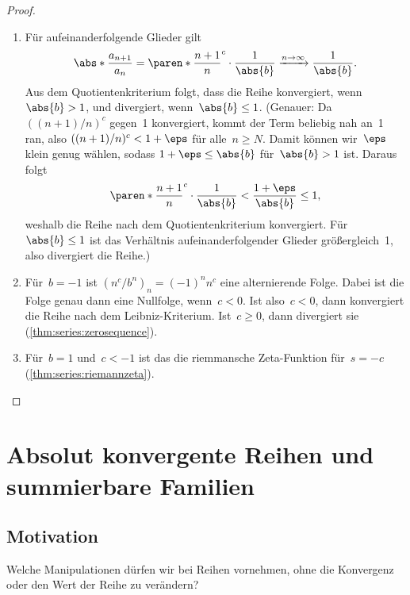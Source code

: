 \documentclass[a4paper]{article}
\begin{document}
\begin{proof}\leavevmode
    \begin{enumerate}
        \item Für aufeinanderfolgende Glieder gilt
              \begin{equation*}
                  \abs*{\frac{a_{n+1}}{a_n}} = \paren*{\frac{n+1}{n}}^c \cdot \frac{1}{\abs{b}} \xrightarrow{n\to\infty} \frac{1}{\abs{b}}.
              \end{equation*}
              Aus dem Quotientenkriterium folgt, dass die Reihe konvergiert, wenn~$\abs{b} > 1$, und divergiert, wenn~$\abs{b} \leq 1$. (Genauer: Da $((n+1)/n)^c$ gegen~1 konvergiert, kommt der Term beliebig nah an~1 ran, also $((n+1)/n)^c < 1+\eps$ für alle~$n \geq N$. Damit können wir~$\eps$ klein genug wählen, sodass $1+\eps \leq \abs{b}$ für~$\abs{b} > 1$ ist. Daraus folgt
              \begin{equation*}
                  \paren*{\frac{n+1}{n}}^c \cdot \frac{1}{\abs{b}} < \frac{1+\eps}{\abs{b}} \leq 1,
              \end{equation*}
              weshalb die Reihe nach dem Quotientenkriterium konvergiert. Für~$\abs{b} \leq 1$ ist das Verhältnis aufeinanderfolgender Glieder größergleich~1, also divergiert die Reihe.)
        \item Für~$b = -1$ ist $(n^c/b^n)_n = (-1)^n n^c$ eine alternierende Folge. Dabei ist die Folge genau dann eine Nullfolge, wenn~$c < 0$. Ist also~$c < 0$, dann konvergiert die Reihe nach dem Leibniz-Kriterium. Ist~$c \geq 0$, dann divergiert sie (\cref{thm:series:zerosequence}).
        \item Für~$b = 1$ und~$c < -1$ ist das die riemmansche Zeta-Funktion für~$s = -c$ (\cref{thm:series:riemannzeta}).\qedhere
    \end{enumerate}
\end{proof}

\section{Absolut konvergente Reihen und summierbare Familien}

\subsection{Motivation}

Welche Manipulationen dürfen wir bei Reihen vornehmen, ohne die Konvergenz oder den Wert der Reihe zu verändern?
\end{document}
